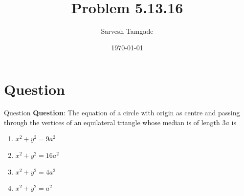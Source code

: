 \documentclass{beamer}
\title{Problem 5.13.16}
\author{Sarvesh Tamgade}
\date{\today}
\numberwithin{equation}{section}
\begin{document}
\begin{frame}
\titlepage
\end{frame}

\section{Question}
\begin{frame}{Question}
\textbf{Question}:
The equation of a circle with origin as centre and passing through the vertices of an equilateral triangle whose median is of length $3a$ is
\begin{enumerate}
\item $x^2 + y^2 = 9a^2$
\item $x^2 + y^2 = 16a^2$
\item $x^2 + y^2 = 4a^2$
\item $x^2 + y^2 = a^2$
\end{enumerate}



\end{frame}
\end{document}
